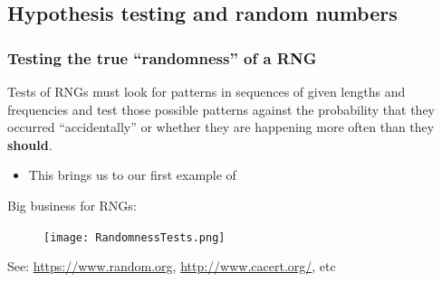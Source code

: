 \documentclass[hyperref={colorlinks=true}]{beamer}
\begin{document}
\subsection[Hypothesis testing and random numbers]{Hypothesis testing and random numbers}

\begin{frame}[fragile]%
  \frametitle{Testing the true ``randomness'' of a RNG}
  
  Tests of RNGs must look for patterns in sequences of given lengths and frequencies and test those possible patterns against the probability that they occurred ``accidentally'' or whether they are happening more often than they \textbf{should}.
  
  \begin{itemize}
    \item[\ra] This brings us to our first example of 
  \end{itemize}
  
  Big business for RNGs:
  
  \begin{figure}
    \texttt{[image: RandomnessTests.png]}
  \end{figure}  
  
  See: \url{https://www.random.org}, \url{http://www.cacert.org/}, etc
  
\end{frame}

\end{document}
